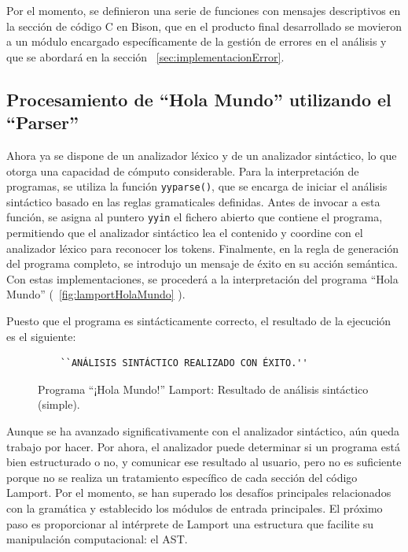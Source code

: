 \vspace{0.5cm}

Por el momento, se definieron una serie de funciones con mensajes descriptivos en la sección de código C en Bison, que en el producto final desarrollado se movieron a un módulo encargado específicamente de la gestión de errores en el análisis y que se abordará en la sección ~\ref{sec:implementacionError}.

\subsection{Procesamiento de ``Hola Mundo'' utilizando el ``Parser''}\label{subsec:holaMundoParser}

Ahora ya se dispone de un analizador léxico y de un analizador sintáctico, lo que otorga una capacidad de cómputo considerable. Para la interpretación de programas, se utiliza la función \texttt{yyparse()}, que se encarga de iniciar el análisis sintáctico basado en las reglas gramaticales definidas. Antes de invocar a esta función, se asigna al puntero \texttt{yyin} el fichero abierto que contiene el programa, permitiendo que el analizador sintáctico lea el contenido y coordine con el analizador léxico para reconocer los tokens. Finalmente, en la regla de generación del programa completo, se introdujo un mensaje de éxito en su acción semántica. Con estas implementaciones, se procederá a la interpretación del programa ``Hola Mundo'' (~\ref{fig:lamportHolaMundo} ).

\vspace{0.5cm}

Puesto que el programa es sintácticamente correcto, el resultado de la ejecución es el siguiente:

\begin{figure}[h]
\begin{verbatim}
    ``ANÁLISIS SINTÁCTICO REALIZADO CON ÉXITO.''
\end{verbatim}
\caption{Programa ``¡Hola Mundo!'' Lamport: Resultado de análisis sintáctico (simple).}
\label{fig:parserHolaMundo}
\end{figure}

Aunque se ha avanzado significativamente con el analizador sintáctico, aún queda trabajo por hacer. Por ahora, el analizador puede determinar si un programa está bien estructurado o no, y comunicar ese resultado al usuario, pero no es suficiente porque no se realiza un tratamiento específico de cada sección del código Lamport. Por el momento, se han superado los desafíos principales relacionados con la gramática y establecido los módulos de entrada principales. El próximo paso es proporcionar al intérprete de Lamport una estructura que facilite su manipulación computacional: el AST.

